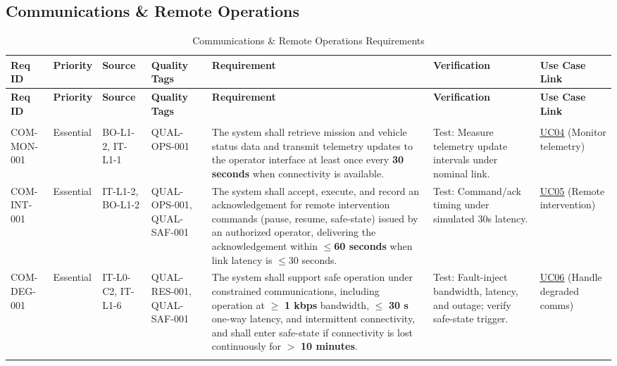 \documentclass[11pt,a4paper]{article}
\let\orighyperref\hyperref
\renewcommand{\hyperref}[2][]{\orighyperref[#1]{\uline{#2}}}%
\begin{document}
\subsection{Communications \& Remote Operations}
\small
\renewcommand{\arraystretch}{1.2}
\setlength{\tabcolsep}{3pt}
\begin{longtable}{|>{\raggedright\arraybackslash}p{}|>{\raggedright\arraybackslash}p{}|>{\raggedright\arraybackslash}p{}|>{\raggedright\arraybackslash}p{}|>{\raggedright\arraybackslash}p{}|>{\raggedright\arraybackslash}p{}|>{\raggedright\arraybackslash}p{}|}
\hline
\rowcolor{tableheader}
\textbf{Req ID} & \textbf{Priority} & \textbf{Source} & \textbf{Quality Tags} & \textbf{Requirement} & \textbf{Verification} & \textbf{Use Case Link} \\
\hline
\endfirsthead
\hline
\rowcolor{tableheader}
\textbf{Req ID} & \textbf{Priority} & \textbf{Source} & \textbf{Quality Tags} & \textbf{Requirement} & \textbf{Verification} & \textbf{Use Case Link} \\
\hline
\endhead
\hline \multicolumn{7}{r}{{Continued on next page}} \\ \hline
\endfoot
\hline
\endlastfoot

COM-MON-001 & Essential & BO-L1-2, IT-L1-1 & QUAL-OPS-001 & The system shall retrieve mission and vehicle status data and transmit telemetry updates to the operator interface at least once every \textbf{30 seconds} when connectivity is available. & Test: Measure telemetry update intervals under nominal link. & \hyperref[fig:usecase-diagram-pdf]{UC04} (Monitor telemetry) \\
\hline
COM-INT-001 & Essential & IT-L1-2, BO-L1-2 & QUAL-OPS-001, QUAL-SAF-001 & The system shall accept, execute, and record an acknowledgement for remote intervention commands (pause, resume, safe-state) issued by an authorized operator, delivering the acknowledgement within \(\leq\)\textbf{60 seconds} when link latency is \(\leq\)30 seconds. & Test: Command/ack timing under simulated 30s latency. & \hyperref[fig:usecase-diagram-pdf]{UC05} (Remote intervention) \\
\hline
COM-DEG-001 & Essential & IT-L0-C2, IT-L1-6 & QUAL-RES-001, QUAL-SAF-001 & The system shall support safe operation under constrained communications, including operation at \(\geq\) \textbf{1 kbps} bandwidth, \(\leq\) \textbf{30 s} one-way latency, and intermittent connectivity, and shall enter safe-state if connectivity is lost continuously for \(>\) \textbf{10 minutes}. & Test: Fault-inject bandwidth, latency, and outage; verify safe-state trigger. & \hyperref[fig:usecase-diagram-pdf]{UC06} (Handle degraded comms) \\
\hline
\caption{Communications \& Remote Operations Requirements}\label{tab:req-communications}
\end{longtable}
\setlength{\tabcolsep}{6pt}
\normalsize
\end{document}
